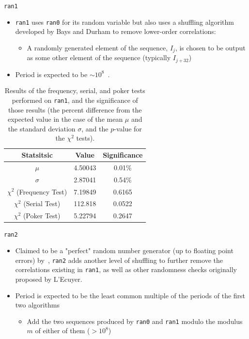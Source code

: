 \documentclass{beamer} %
\begin{document}
\begin{frame}{\texttt{ran1}}
\begin{itemize}
\item \texttt{ran1} uses \texttt{ran0} for its random variable but also uses a shuffling algorithm developed by Bays and Durham to remove lower-order correlations:
\begin{itemize}
\item A randomly generated element of the sequence, $I_{j}$, is chosen to be output as some other element of the sequence (typically $I_{j+32}$)
\end{itemize}
\item  Period is expected to be $\sim10^{8}$~\cite{recipes}.
\end{itemize}

\begin{table}[ht]
\begin{center}
\begin{tabular}{c|c|c} \hline
Statsitsic & Value & Significance\\\hline
$\mu$ & 4.50043 & 0.01\%\\
$\sigma$ & 2.87041 & 0.54\%\\
$\chi^{2}$ (Frequency Test) & 7.19849 & 0.6165\\
$\chi^{2}$ (Serial Test) & 112.818 & 0.0522\\
$\chi^{2}$ (Poker Test) & 5.22794 & 0.2647\\ \hline
\end{tabular}
\caption{Results of the frequency, serial, and poker tests performed on \texttt{ran1}, and the significance of those results (the percent difference from the expected value in the case of the mean $\mu$ and the standard deviation $\sigma$, and the $p$-value for the $\chi^{2}$ tests).}
\label{tab:ran1results}
\end{center}
\end{table}
\end{frame}

\begin{frame}{\texttt{ran2}}
\begin{itemize}
\item Claimed to be a "perfect" random number generator (up to floating point errors) by~\cite{recipes}, \texttt{ran2} adds another level of shuffling to further remove the correlations existing in \texttt{ran1}, as well as other randomness checks originally proposed by L'Ecuyer.  
\item Period is expected to be the least common multiple of the periods of the first two algorithms
\begin{itemize}
\item Add the two sequences produced by \texttt{ran0} and \texttt{ran1} modulo the modulus $m$ of either of them ($>10^{8}$)~\cite{recipes}
\end{itemize}
\end{itemize}
\end{frame}
\end{document}
